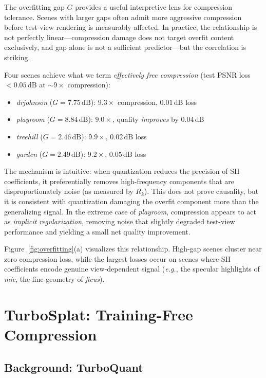 \documentclass[sigconf,review]{acmart}
\newcommand{\eg}{\textit{e.g.}}
\newcommand{\dB}{\,\text{dB}}
\newcommand{\R}[1]{R_{#1}}
\begin{document}
The overfitting gap $G$ provides a useful interpretive lens for compression tolerance.
Scenes with larger gaps often admit more aggressive compression before test-view rendering is measurably affected.
In practice, the relationship is not perfectly linear---compression damage does not target overfit content exclusively, and gap alone is not a sufficient predictor---but the correlation is striking.

Four scenes achieve what we term \emph{effectively free compression} (test PSNR loss $< 0.05\dB$ at ${\sim}9{\times}$ compression):
\begin{itemize}
  \item \textit{drjohnson} ($G{=}7.75\dB$): $9.3{\times}$ compression, $0.01\dB$ loss
  \item \textit{playroom} ($G{=}8.84\dB$): $9.0{\times}$, quality \emph{improves} by $0.04\dB$
  \item \textit{treehill} ($G{=}2.46\dB$): $9.9{\times}$, $0.02\dB$ loss
  \item \textit{garden} ($G{=}2.49\dB$): $9.2{\times}$, $0.05\dB$ loss
\end{itemize}

The mechanism is intuitive: when quantization reduces the precision of SH coefficients, it preferentially removes high-frequency components that are disproportionately noise (as measured by $\R{k}$).
This does not prove causality, but it is consistent with quantization damaging the overfit component more than the generalizing signal.
In the extreme case of \textit{playroom}, compression appears to act as \emph{implicit regularization}, removing noise that slightly degraded test-view performance and yielding a small net quality improvement.

Figure~\ref{fig:overfitting}(a) visualizes this relationship.
High-gap scenes cluster near zero compression loss, while the largest losses occur on scenes where SH coefficients encode genuine view-dependent signal (\eg{}, the specular highlights of \textit{mic}, the fine geometry of \textit{ficus}).

\section{TurboSplat: Training-Free Compression}
\label{sec:method}

\subsection{Background: TurboQuant}
\label{sec:turboquant}
\end{document}
